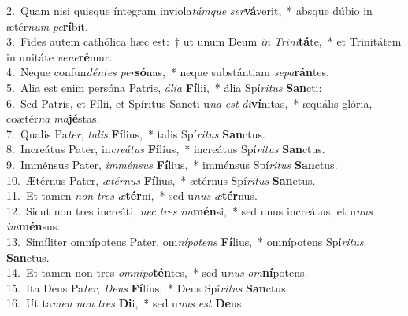 {2.~}Quam nisi quisque íntegram inviola\textit{tám}\textit{que} \textit{ser}\textbf{vá}verit,~* absque dúbio in ætér\textit{num} \textit{pe}\textbf{rí}bit.\\
{3.~}Fides autem cathólica hæc est:~† ut unum Deum \textit{in} \textit{Tri}\textit{ni}\textbf{tá}te,~* et Trinitátem in unitáte \textit{ve}\textit{ne}\textbf{ré}mur.\\
{4.~}Neque confun\textit{dén}\textit{tes} \textit{per}\textbf{só}nas,~* neque substántiam \textit{se}\textit{pa}\textbf{rán}tes.\\
{5.~}Alia est enim persóna Patris, \textit{á}\textit{li}\textit{a} \textbf{Fí}lii,~* ália Spí\textit{ri}\textit{tus} \textbf{San}cti:\\
{6.~}Sed Patris, et Fílii, et Spíritus Sancti u\textit{na} \textit{est} \textit{di}\textbf{ví}nitas,~* æquális glória, coætér\textit{na} \textit{ma}\textbf{jé}stas.\\
{7.~}Qualis Pa\textit{ter}, \textit{ta}\textit{lis} \textbf{Fí}lius,~* talis Spí\textit{ri}\textit{tus} \textbf{San}ctus.\\
{8.~}Increátus Pater, in\textit{cre}\textit{á}\textit{tus} \textbf{Fí}lius,~* increátus Spí\textit{ri}\textit{tus} \textbf{San}ctus.\\
{9.~}Imménsus Pater, \textit{im}\textit{mén}\textit{sus} \textbf{Fí}lius,~* imménsus Spí\textit{ri}\textit{tus} \textbf{San}ctus.\\
{10.~}Ætérnus Pater, \textit{æ}\textit{tér}\textit{nus} \textbf{Fí}lius,~* ætérnus Spí\textit{ri}\textit{tus} \textbf{San}ctus.\\
{11.~}Et tamen \textit{non} \textit{tres} \textit{æ}\textbf{tér}ni,~* sed u\textit{nus} \textit{æ}\textbf{tér}nus.\\
{12.~}Sicut non tres increáti, \textit{nec} \textit{tres} \textit{im}\textbf{mén}si,~* sed unus increátus, et u\textit{nus} \textit{im}\textbf{mén}sus.\\
{13.~}Simíliter omnípotens Pater, om\textit{ní}\textit{po}\textit{tens} \textbf{Fí}lius,~* omnípotens Spí\textit{ri}\textit{tus} \textbf{San}ctus.\\
{14.~}Et tamen non tres \textit{om}\textit{ni}\textit{po}\textbf{tén}tes,~* sed u\textit{nus} \textit{om}\textbf{ní}potens.\\
{15.~}Ita Deus Pa\textit{ter}, \textit{De}\textit{us} \textbf{Fí}lius,~* Deus Spí\textit{ri}\textit{tus} \textbf{San}ctus.\\
{16.~}Ut ta\textit{men} \textit{non} \textit{tres} \textbf{Di}i,~* sed u\textit{nus} \textit{est} \textbf{De}us.\\
